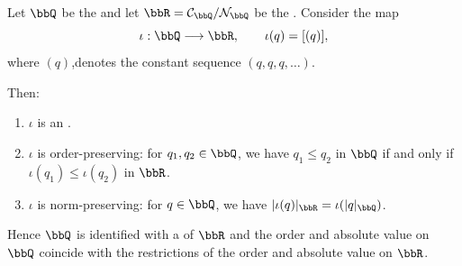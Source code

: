 \begin{proposition} \label{proposition:the_field_of_rational_numbers_embeds_into_the_field_of_real_numbers}
    Let $\bbQ$ be the  and let $\bbR = \mathcal{C}_\bbQ / \mathcal{N}_\bbQ$ be the . Consider the map
    $$\iota: \bbQ \longrightarrow \bbR, \qquad \iota(q) = [(q)],$$
    where $(q)$,denotes the constant sequence $(q, q, q, \dots)$.

    Then:
    \begin{enumerate}
        \item $\iota$ is an  .
        \item $\iota$ is order-preserving: for $q_1, q_2 \in \bbQ$, we have $q_1 \le q_2$ in $\bbQ$ if and only if $\iota(q_1) \le \iota(q_2)$ in $\bbR$.
        \item $\iota$ is norm-preserving: for $q \in \bbQ$, we have $|\iota(q)|_\bbR = \iota(|q|_\bbQ)$.
        
    \end{enumerate}
    Hence $\bbQ$ is identified with a  of $\bbR$ and the order and absolute value on $\bbQ$ coincide with the restrictions of the order and absolute value on $\bbR$.
\end{proposition}

